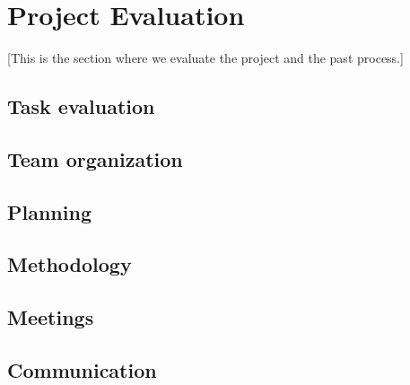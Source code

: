 \section{Project Evaluation}\label{Project Evaluation}
    [This is the section where we evaluate the project and the past process.]
    
    \subsection{Task evaluation}
    
    \subsection{Team organization}
    \subsection{Planning}
    \subsection{Methodology}
    \subsection{Meetings}
    \subsection{Communication}
    
